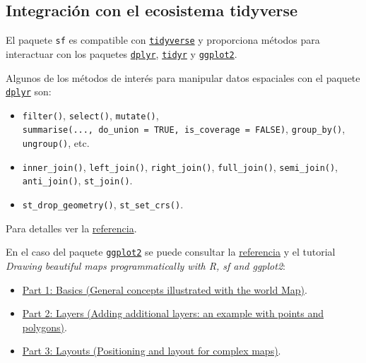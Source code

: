 \documentclass[
]{book}
\providecommand{\tightlist}{%
  \setlength{\itemsep}{0pt}\setlength{\parskip}{0pt}}
\theoremstyle{break}
\theoremstyle{definition}
\theoremstyle{definition}
\theoremstyle{definition}
\theoremstyle{definition}
\theoremstyle{remark}
\begin{document}
\subsection{\texorpdfstring{Integración con el ecosistema \textbf{tidyverse}}{Integración con el ecosistema tidyverse}}\label{tidyverse-sf}

El paquete \texttt{sf} es compatible con \href{http://tidyverse.org}{\texttt{tidyverse}} y proporciona métodos para interactuar con los paquetes \href{https://dplyr.tidyverse.org}{\texttt{dplyr}},
\href{http://tidyr.tidyverse.org}{\texttt{tidyr}} y \href{https://ggplot2.tidyverse.org}{\texttt{ggplot2}}.

Algunos de los métodos de interés para manipular datos espaciales con el paquete \href{https://dplyr.tidyverse.org}{\texttt{dplyr}} son:

\begin{itemize}
\tightlist
\item
  \texttt{filter()}, \texttt{select()}, \texttt{mutate()}, \texttt{summarise(...,\ do\_union\ =\ TRUE,\ is\_coverage\ =\ FALSE)}, \texttt{group\_by()}, \texttt{ungroup()}, etc.
\item
  \texttt{inner\_join()}, \texttt{left\_join()}, \texttt{right\_join()}, \texttt{full\_join()}, \texttt{semi\_join()}, \texttt{anti\_join()}, \texttt{st\_join()}.
\item
  \texttt{st\_drop\_geometry()}, \texttt{st\_set\_crs()}.
\end{itemize}

Para detalles ver la \href{https://r-spatial.github.io/sf/reference/tidyverse.html}{referencia}.

En el caso del paquete \href{https://ggplot2.tidyverse.org}{\texttt{ggplot2}} se puede consultar la \href{https://ggplot2.tidyverse.org/reference/ggsf.html}{referencia} y el tutorial \emph{Drawing beautiful maps programmatically with R, sf and ggplot2}:

\begin{itemize}
\tightlist
\item
  \href{https://r-spatial.org/r/2018/10/25/ggplot2-sf.html}{Part 1: Basics (General concepts illustrated with the world Map)}.
\item
  \href{https://r-spatial.org/r/2018/10/25/ggplot2-sf-2.html}{Part 2: Layers (Adding additional layers: an example with points and polygons)}.
\item
  \href{https://r-spatial.org/r/2018/10/25/ggplot2-sf-3.html}{Part 3: Layouts (Positioning and layout for complex maps)}.
\end{itemize}
\end{document}
